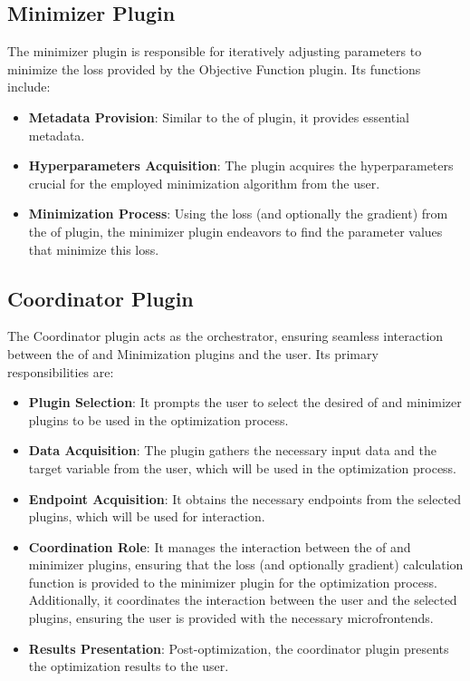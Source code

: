 \documentclass[
  a4paper,  %
  twoside,  %
  bibliography=totoc,
  headsepline,
  cleardoublepage=empty,
  parskip=half,
  draft=false
]{scrbook}
\begin{document}
\subsection{Minimizer Plugin}

The minimizer plugin is responsible for iteratively adjusting parameters to minimize the loss provided by the Objective Function plugin.
Its functions include:

\begin{itemize}
\item \textbf{Metadata Provision}: Similar to the \gls{of} plugin, it provides essential metadata.
\item \textbf{Hyperparameters Acquisition}: The plugin acquires the hyperparameters crucial for the employed minimization algorithm from the user.
\item \textbf{Minimization Process}: Using the loss (and optionally the gradient) from the \gls{of} plugin, the minimizer plugin endeavors to find the parameter values that minimize this loss.
\end{itemize}

\subsection{Coordinator Plugin}

The Coordinator plugin acts as the orchestrator, ensuring seamless interaction between the \gls{of} and Minimization plugins and the user.
Its primary responsibilities are:

\begin{itemize}
\item \textbf{Plugin Selection}: It prompts the user to select the desired \gls{of} and minimizer plugins to be used in the optimization process.
\item \textbf{Data Acquisition}: The plugin gathers the necessary input data and the target variable from the user, which will be used in the optimization process.
\item \textbf{Endpoint Acquisition}: It obtains the necessary endpoints from the selected plugins, which will be used for interaction.
\item \textbf{Coordination Role}: It manages the interaction between the \gls{of} and minimizer plugins, ensuring that the loss (and optionally gradient) calculation function is provided to the minimizer plugin for the optimization process.
Additionally, it coordinates the interaction between the user and the selected plugins, ensuring the user is provided with the necessary microfrontends.
\item \textbf{Results Presentation}: Post-optimization, the coordinator plugin presents the optimization results to the user.
\end{itemize}
\end{document}
